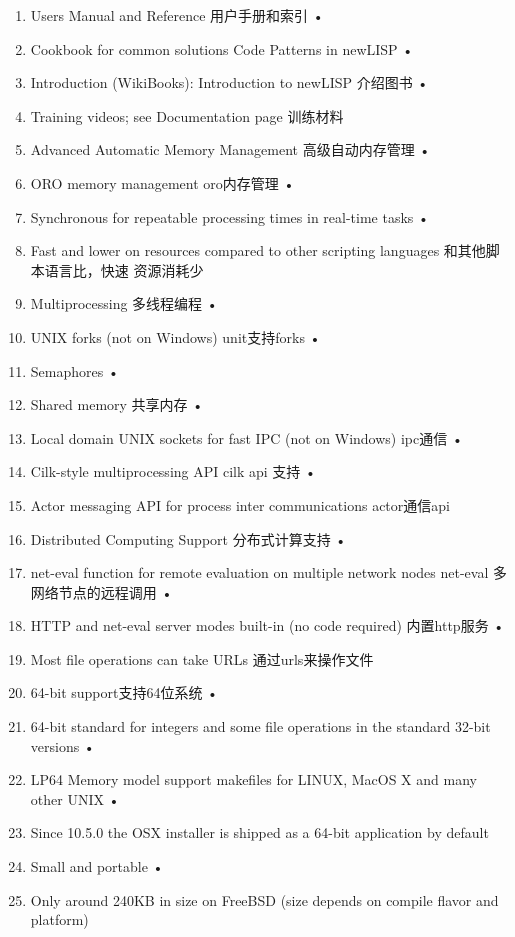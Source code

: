 \documentclass[cn,11pt]{elegantbook}
\begin{document}
\begin{enumerate}
  • \item Users Manual and Reference 用户手册和索引
  • \item Cookbook for common solutions Code Patterns in newLISP 
  • \item Introduction (WikiBooks): Introduction to newLISP 介绍图书
  • \item Training videos; see Documentation page 训练材料
  \item Advanced Automatic Memory Management 高级自动内存管理
  • \item ORO memory management oro内存管理
  • \item Synchronous for repeatable processing times in real-time tasks 
  • \item Fast and lower on resources compared to other scripting languages 和其他脚本语言比，快速 资源消耗少
  \item Multiprocessing 多线程编程
  • \item UNIX forks (not on Windows) unit支持forks 
  • \item Semaphores  
  • \item Shared memory 共享内存 
  • \item Local domain UNIX sockets for fast IPC (not on Windows) ipc通信
  • \item Cilk-style multiprocessing API  cilk api 支持
  • \item Actor messaging API for process inter communications actor通信api 
  \item Distributed Computing Support 分布式计算支持
  • \item net-eval function for remote evaluation on multiple network nodes net-eval 多网络节点的远程调用 
  • \item HTTP and net-eval server modes built-in (no code required) 内置http服务
  • \item Most file operations can take URLs  通过urls来操作文件
  \item 64-bit support支持64位系统
  • \item 64-bit standard for integers and some file operations in the standard 32-bit versions 
  • \item LP64 Memory model support makefiles for LINUX, MacOS X and many other UNIX 
  • \item Since 10.5.0 the OSX installer is shipped as a 64-bit application by default 
  \item Small and portable
  • \item Only around 240KB in size on FreeBSD (size depends on compile flavor and platform) 

\end{enumerate}
\end{document}

